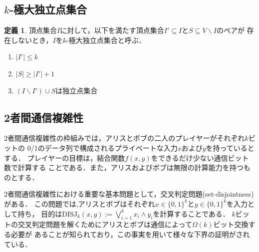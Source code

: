 \documentclass[a4j,twoside]{jarticle}
\theoremstyle{definition}
\newtheorem{definition}{定義}
\begin{document}
\begin{論文概要}
\subsection{$k$-極大独立点集合}
\begin{definition}
頂点集合$I$に対して，以下を満たす頂点集合$I' \subseteq I$と$S\subseteq V \backslash I$のペアが
存在しないとき，$I$を$k$-極大独立点集合と呼ぶ．
\begin{enumerate}
\item $|I'| \leq k$
\item $|S| \geq |I'| + 1$
\item $(I \backslash I') \cup S$は独立点集合
\end{enumerate}
\end{definition}

\subsection{2者間通信複雑性}
2者間通信複雑性の枠組みでは，アリスとボブの二人のプレイヤーがそれぞれ$k$ビットの
0/1のデータ列で構成されるプライベートな入力$x$および$y$を持っているとする．
プレイヤーの目標は，結合関数$f(x,y)$をできるだけ少ない通信ビット数で計算する
ことである．また，アリスおよびボブは無限の計算能力を持つものとする．

2者間通信複雑性における重要な基本問題として，交叉判定問題(set-disjointness)がある．
この問題では,アリスとボブはそれぞれ$x \in \{0, 1\}^{k}$と$y \in \{0, 1\}^{k}$を入力として持ち，
目的は$\mathrm{DISJ}_{k} (x, y) :=\bigvee_{i = 1}^{k} x_{i} \land y_{i}$を計算することである．
$k$ビットの交叉判定問題を解くためにアリスとボブは通信によって$\Omega(k)$ビット交換する必要が
あることが知られており\cite{kalyanasundaram1992probabilistic}，この事実を用いて様々な下界の証明がされている．


\end{論文概要}
\end{document}
